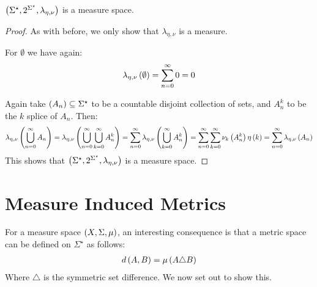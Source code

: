 \documentclass[12pt]{article}
\begin{document}
\begin{theorem}
  \(\left(\Sigma^\star, 2^{\Sigma^\star}, \lambda_{\eta, \nu}\right)\)
  is a measure space.
\end{theorem}
\begin{proof}
  As with before, we only show that \(\lambda_{\eta, \nu}\) is a measure.

  For \(\emptyset\) we have again:
  \begin{align*}
    \lambda_{\eta, \nu}\left(\emptyset\right) = \sum_{n = 0}^{\infty} 0 = 0
  \end{align*}

  Again take \(\left(A_n\right) \subseteq \Sigma^\star\) to be a
  countable disjoint collection of sets,
  and \(A_n ^k\) to be the \(k\) splice of \(A_n\).
  Then:
  \begin{align*}
    \lambda_{\eta, \nu} \left(\bigcup_{n = 0}^{\infty} A_n\right)
      = \lambda_{\eta, \nu} \left(\bigcup_{n = 0}^{\infty} \bigcup_{k = 0}^{\infty} A_n ^k\right)
      = \sum_{n = 0}^{\infty} \lambda_{\eta, \nu} \left(\bigcup_{k = 0}^{\infty} A_n ^k\right)
      = \sum_{n = 0}^{\infty} \sum_{k = 0}^{\infty} \nu_k \left(A_n ^k\right) \eta\left(k\right)
      = \sum_{n = 0}^{\infty} \lambda_{\eta, \nu} \left(A_n\right)
  \end{align*}
  This shows that
  \(\left(\Sigma^\star, 2^{\Sigma^\star}, \lambda_{\eta, \nu}\right)\)
  is a measure space.
\end{proof}


\section{Measure Induced Metrics}
For a measure space \(\left(X, \Sigma, \mu\right)\),
an interesting consequence is that a
metric space can be defined on \(\Sigma^\star\)
as follows:
\begin{align*}
  d\left(A, B\right) = \mu\left(A \triangle B\right)
\end{align*}
Where \(\triangle\) is the symmetric set difference.
We now set out to show this.
\end{document}
